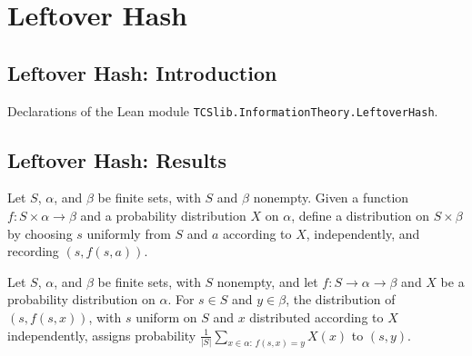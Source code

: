 \section{Leftover Hash}
\subsection*{Leftover Hash: Introduction}

Declarations of the Lean module \texttt{TCSlib.InformationTheory.LeftoverHash}.

\subsection*{Leftover Hash: Results}

\begin{definition}
\label{TCSlib.InformationTheory.hashPair}
\leanok
{}
Let $S$, $\alpha$, and $\beta$ be finite sets, with $S$ and $\beta$ nonempty. Given a
function $f:S\times\alpha\to\beta$ and a probability distribution $X$ on $\alpha$,
define a distribution on $S\times\beta$ by choosing $s$ uniformly from $S$ and $a$
according to $X$, independently, and recording $(s,f(s,a))$.
\end{definition}

\begin{theorem}
\label{TCSlib.InformationTheory.hashPair_apply}
\leanok
{}
Let $S$, $\alpha$, and $\beta$ be finite sets, with $S$ nonempty, and let $f\colon
S\to\alpha\to\beta$ and $X$ be a probability distribution on $\alpha$. For $s\in S$ and
$y\in\beta$, the distribution of $(s,f(s,x))$, with $s$ uniform on $S$ and $x$
distributed according to $X$ independently, assigns probability
$\frac{1}{|S|}\sum_{x\in\alpha:\,f(s,x)=y}X(x)$ to $(s,y)$.
\end{theorem}

